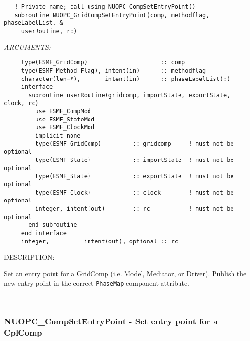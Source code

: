  
\begin{verbatim}   ! Private name; call using NUOPC_CompSetEntryPoint()
   subroutine NUOPC_GridCompSetEntryPoint(comp, methodflag, phaseLabelList, &
     userRoutine, rc)\end{verbatim}{\em ARGUMENTS:}
\begin{verbatim}     type(ESMF_GridComp)                     :: comp
     type(ESMF_Method_Flag), intent(in)      :: methodflag
     character(len=*),       intent(in)      :: phaseLabelList(:)
     interface
       subroutine userRoutine(gridcomp, importState, exportState, clock, rc)
         use ESMF_CompMod
         use ESMF_StateMod
         use ESMF_ClockMod
         implicit none
         type(ESMF_GridComp)         :: gridcomp     ! must not be optional
         type(ESMF_State)            :: importState  ! must not be optional
         type(ESMF_State)            :: exportState  ! must not be optional
         type(ESMF_Clock)            :: clock        ! must not be optional
         integer, intent(out)        :: rc           ! must not be optional
       end subroutine
     end interface
     integer,          intent(out), optional :: rc \end{verbatim}
{\sf DESCRIPTION:\\ }


   Set an entry point for a GridComp (i.e. Model, Mediator, or Driver). Publish
   the new entry point in the correct {\tt PhaseMap} component attribute. 
 
\mbox{}\hrulefill\ 
 
\subsubsection [NUOPC\_CompSetEntryPoint] {NUOPC\_CompSetEntryPoint - Set entry point for a CplComp}


